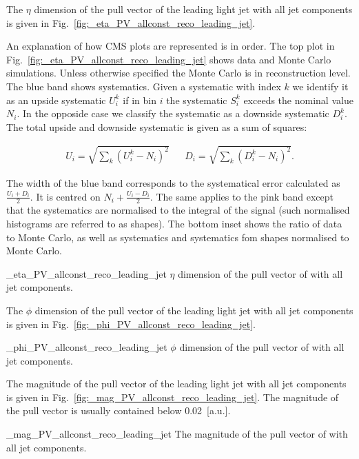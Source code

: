 The $\eta$ dimension of the pull vector of the leading light jet with all jet components is given in Fig.~\ref{fig:_eta_PV_allconst_reco_leading_jet}.

An explanation of how CMS plots are represented is in order. The top plot in Fig.~\ref{fig:_eta_PV_allconst_reco_leading_jet} shows data and Monte Carlo simulations. Unless otherwise specified the Monte Carlo is in reconstruction level. The blue band shows systematics. Given a systematic with index $k$ we identify it as an upside systematic $U^{k}_{i}$ if in bin $i$ the systematic $S^{k}_i$ exceeds the nominal value $N_{i}$. In the opposide case we classify the systematic as a downside systematic $D^{k}_{i}$. The total upside and downside systematic is given as a sum of squares:

\begin{align}
U_{i}=\sqrt{\sum_{k}\left(U^{k}_{i}-N_{i}\right)^{2}} && D_{i}=\sqrt{\sum_{k}\left(D^{k}_{i}-N_{i}\right)^{2}}.
\end{align}

The width of the blue band corresponds to the systematical error calculated as $\frac{U_{i}+D_{i}}{2}$. It is centred on $N_{i}+\frac{U_{i}-D_{i}}{2}$. The same applies to the pink band except that the systematics are normalised to the integral of the signal (such normalised histograms are referred to as shapes). The bottom inset shows the ratio of data to Monte Carlo, as well as systematics and systematics fom shapes normalised to Monte Carlo.

          {_eta_PV_allconst_reco_leading_jet}
          {$\eta$ dimension of the pull vector of \leadingjet with all jet components.}

The $\phi$ dimension of the pull vector of the leading light jet with all jet components is given in Fig.~\ref{fig:_phi_PV_allconst_reco_leading_jet}. 

          {_phi_PV_allconst_reco_leading_jet}
          {$\phi$ dimension of the pull vector of \leadingjet with all jet components.}

The magnitude of the pull vector of the leading light jet with all jet components is given in Fig.~\ref{fig:_mag_PV_allconst_reco_leading_jet}. The magnitude of the pull vector is usually contained below 0.02~[a.u.].

          {_mag_PV_allconst_reco_leading_jet}
          {The magnitude of the pull vector of \leadingjet with all jet components.}

